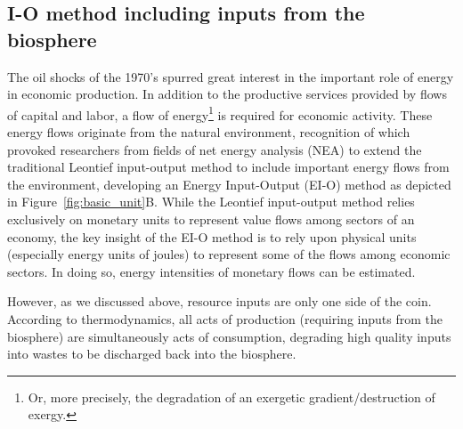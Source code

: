 \subsection{I-O method including inputs from the biosphere}
\label{sec:IO_resource}

The oil shocks of the 1970's spurred great interest in
the important role of energy in economic production.
In addition to the productive services 
provided by flows of capital and labor,
a flow of energy\footnote{Or, more precisely, 
the degradation of an exergetic gradient/destruction of exergy.} 
is required for economic activity. 
These energy flows originate from the natural environment, 
recognition of which provoked researchers from fields of 
net energy analysis (NEA) to extend 
the traditional Leontief
input-output method to include important 
energy flows from the environment, 
developing an Energy Input-Output (EI-O)
method as depicted in Figure~\ref{fig:basic_unit}B.\cite{Carter1974,
Bullard1975,Bullard1976a,Herendeen1978,Costanza:1980ww,
Casler1984,Joshi:1999uw,Suh2009}
While the Leontief input-output method
relies exclusively 
on monetary units to represent value flows 
among sectors of an economy, 
the key insight of the EI-O method 
is to rely upon physical units 
(especially energy units of joules) 
to represent some of the flows among economic sectors. 
In doing so, 
energy intensities of monetary flows can be estimated. 

However,
as we discussed above,
resource inputs are only one side of the coin.
According to thermodynamics,
all acts of production (requiring inputs from the biosphere)
are simultaneously acts of consumption,
degrading high quality inputs into wastes to be 
discharged back into the biosphere.


